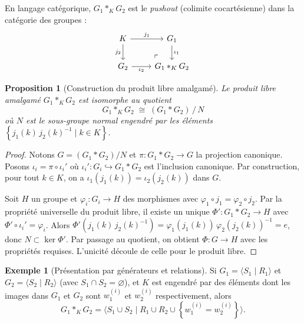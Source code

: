 \documentclass[12pt,a4paper,openany]{book}
\theoremstyle{definition}
\newtheorem{exemple}[definition]{Exemple}
\theoremstyle{plain}
\newtheorem{proposition}[definition]{Proposition}
\theoremstyle{remark}
\newcommand{\set}[1]{\left\{#1\right\}}
\begin{document}
En langage catégorique, $G_1 *_K G_2$ est le \emph{pushout}
(colimite cocartésienne) dans la catégorie des groupes :
\[
\begin{tikzcd}
K \arrow[r, "j_1"] \arrow[d, "j_2"'] & G_1 \arrow[d, "\iota_1"] \\
G_2 \arrow[r, "\iota_2"'] & G_1 *_K G_2 \arrow[ul, phantom, "\ulcorner" very near start]
\end{tikzcd}
\]

\begin{proposition}[Construction du produit libre amalgamé]\label{prop:construction-amalgame}
Le produit libre amalgamé $G_1 *_K G_2$ est isomorphe au quotient
\[
G_1 *_K G_2 \;\cong\; (G_1 * G_2) \,\big/\, N
\]
où $N$ est le sous-groupe normal engendré par les éléments
$\set{j_1(k)\, j_2(k)^{-1} \mid k \in K}$.
\end{proposition}

\begin{proof}
Notons $G = (G_1 * G_2)/N$ et $\pi \colon G_1 * G_2 \to G$ la projection canonique.
Posons $\iota_i = \pi \circ \iota_i'$ où $\iota_i' \colon G_i \hookrightarrow G_1 * G_2$
est l'inclusion canonique. Par construction, pour tout $k \in K$, on a
$\iota_1(j_1(k)) = \iota_2(j_2(k))$ dans $G$.

Soit $H$ un groupe et $\varphi_i \colon G_i \to H$ des morphismes avec
$\varphi_1 \circ j_1 = \varphi_2 \circ j_2$. Par la propriété universelle du produit libre,
il existe un unique $\Phi' \colon G_1 * G_2 \to H$ avec $\Phi' \circ \iota_i' = \varphi_i$.
Alors $\Phi'(j_1(k)\, j_2(k)^{-1}) = \varphi_1(j_1(k))\, \varphi_2(j_2(k))^{-1} = e$,
donc $N \subset \ker \Phi'$. Par passage au quotient, on obtient
$\Phi \colon G \to H$ avec les propriétés requises. L'unicité découle de celle
pour le produit libre.
\end{proof}

\begin{exemple}[Présentation par générateurs et relations]\label{ex:amalgame-presentation}
Si $G_1 = \langle S_1 \mid R_1 \rangle$ et $G_2 = \langle S_2 \mid R_2 \rangle$
(avec $S_1 \cap S_2 = \varnothing$), et $K$ est engendré par des éléments dont les images
dans $G_1$ et $G_2$ sont $w_1^{(i)}$ et $w_2^{(i)}$ respectivement, alors
\[
G_1 *_K G_2 = \langle S_1 \cup S_2 \mid R_1 \cup R_2 \cup \set{w_1^{(i)} = w_2^{(i)}} \rangle.
\]
\end{exemple}

\end{document}
